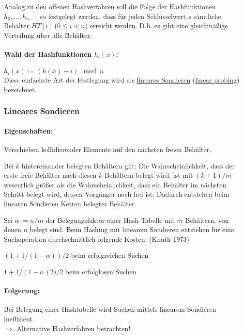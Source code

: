 Analog zu den offenen Hashverfahren soll die Folge der Hashfunktionen $h_0, \ldots, h_{n−1}$ so festgelegt werden, dass für jeden Schlüsselwert $s$ sämtliche Behälter $HT[i]$ ($0 \le i < n$) erreicht werden. D.h. es gibt eine {\flqq gleichmäßige\frqq} Verteilung über alle Behälter.

\paragraph{Wahl der Hashfunktionen $h_i(x)$:} $h_i(x) := (h(x) + i) \mod n$\\
Diese einfachste Art der Festlegung wird als \ul{lineares Sondieren} (\ul{linear probing}) bezeichnet.

\subsubsection{Lineares Sondieren}
\paragraph{Eigenschaften:}
\begin{compactitem}
	\item Verschieben {\flqq kollidierender\frqq} Elemente auf den nächsten freien Behälter.
	\item Bei $k$ hintereinander belegten Behältern gilt: Die Wahrscheinlichkeit, dass der erste freie Behälter nach diesen $k$ Behältern belegt wird, ist mit $(k + 1)/m$ wesentlich größer als die Wahrscheinlichkeit, dass ein Behälter im nächsten Schritt belegt wird, dessen Vorgänger noch frei ist. Dadurch entstehen beim linearen Sondieren {\flqq Ketten\frqq} belegter Behälter.
	\item Sei $\alpha := n/m$ der Belegungsfaktor einer Hash-Tabelle mit $m$ Behältern, von denen $n$ belegt sind. Beim Hashing mit linearem Sondieren entstehen für eine Suchoperation durchschnittlich folgende Kosten: (Knuth 1973)
	\begin{compactitem}
		\item $(1 + 1/(1 − \alpha ))/2$ beim erfolgreichen Suchen
		\item $1 + 1/(1 − \alpha )2)/2$ beim erfolglosen Suchen
	\end{compactitem}
\end{compactitem}

\paragraph{Folgerung:} Bei Belegung einer Hashtabelle wird Suchen mittels linearem Sondieren ineffizient.\\
$\Rightarrow$ Alternative Hashverfahren betrachten!

